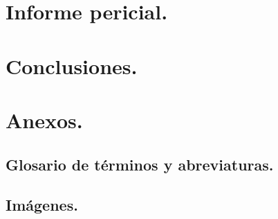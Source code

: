 \documentclass[12pt,a4paper]{report}
\begin{document}
\chapter{Informe pericial.}

\clearpage

\chapter{Conclusiones.}

\clearpage

\chapter{Anexos.}

\clearpage

\section{Glosario de términos y abreviaturas.}

\clearpage

\section{Imágenes.}

\clearpage


\clearpage
\end{document}
